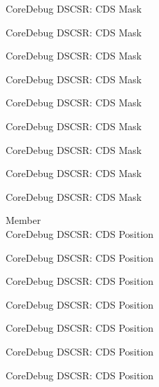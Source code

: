\begin{DoxyRefList}
\label{deprecated__deprecated000647}%
%
Core\+Debug DSCSR\+: CDS Mask 

\label{deprecated__deprecated000753}%
%
Core\+Debug DSCSR\+: CDS Mask 

\label{deprecated__deprecated000807}%
%
Core\+Debug DSCSR\+: CDS Mask 

\label{deprecated__deprecated000883}%
%
Core\+Debug DSCSR\+: CDS Mask 

\label{deprecated__deprecated000946}%
%
Core\+Debug DSCSR\+: CDS Mask 

\label{deprecated__deprecated001025}%
%
Core\+Debug DSCSR\+: CDS Mask 

\label{deprecated__deprecated001101}%
%
Core\+Debug DSCSR\+: CDS Mask 

\label{deprecated__deprecated001204}%
%
Core\+Debug DSCSR\+: CDS Mask 

\label{deprecated__deprecated001306}%
%
Core\+Debug DSCSR\+: CDS Mask  
\item[Member \doxylink{group___c_m_s_i_s___s_c_b_ga4be5d0f8af5d7d8ec04bde78ce18e10e}{Core\+Debug\+\_\+\+DSCSR\+\_\+\+CDS\+\_\+\+Pos} ]\hfill \\
\label{deprecated__deprecated000093}%
%
Core\+Debug DSCSR\+: CDS Position 

\label{deprecated__deprecated000147}%
%
Core\+Debug DSCSR\+: CDS Position 

\label{deprecated__deprecated000223}%
%
Core\+Debug DSCSR\+: CDS Position 

\label{deprecated__deprecated000286}%
%
Core\+Debug DSCSR\+: CDS Position 

\label{deprecated__deprecated000365}%
%
Core\+Debug DSCSR\+: CDS Position 

\label{deprecated__deprecated000441}%
%
Core\+Debug DSCSR\+: CDS Position 

\label{deprecated__deprecated000544}%
%
Core\+Debug DSCSR\+: CDS Position 


\end{DoxyRefList}
